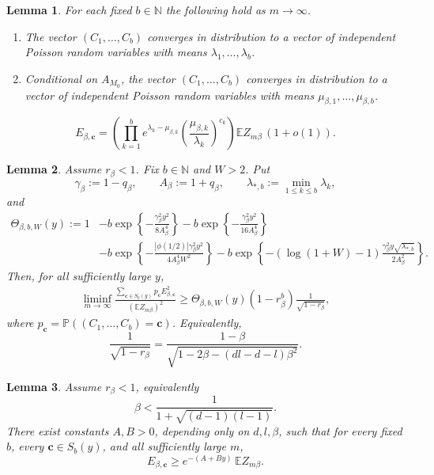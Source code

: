 \documentclass[10pt,a4paper]{amsart}
\newtheorem{lemma}{Lemma}
\begin{document}
\begin{lemma}\label{l33}
For each fixed \(b\in\mathbb N\) the following hold as \(m\to\infty\).
\begin{enumerate}
\item The vector \((C_1,\ldots,C_b)\) converges in distribution to a vector of
independent Poisson random variables with means \(\lambda_1,\ldots,\lambda_b\).
\item Conditional on \(A_{M_0}\), the vector \((C_1,\ldots,C_b)\) converges in
distribution to a vector of independent Poisson random variables with means
\(\mu_{\beta,1},\ldots,\mu_{\beta,b}\).
\end{enumerate}
\end{lemma}

\begin{equation}\label{ebc}
  E_{\beta,\mathbf c}
  =\left(\prod_{k=1}^b
      e^{\lambda_k-\mu_{\beta,k}}
      \left(\frac{\mu_{\beta,k}}{\lambda_k}\right)^{c_k}\right)
    \mathbb E Z_{m\beta}\,(1+o(1)).
\end{equation}

\begin{lemma}\label{l35}
Assume \(r_\beta<1\).  Fix \(b\in\mathbb N\) and \(W>2\).  Put
\[
  \gamma_\beta:=1-q_\beta,
  \qquad A_\beta:=1+q_\beta,
  \qquad \lambda_{*,b}:=\min_{1\le k\le b}\lambda_k,
\]
and
\begin{align*}
\Theta_{\beta,b,W}(y)
:=1&-b\exp\left\{-\frac{\gamma_\beta^2y^2}{8A_\beta^4}\right\}
    -b\exp\left\{-\frac{\gamma_\beta^2y^2}{16A_\beta^4}\right\} \\
&-b\exp\left\{-\frac{|\phi(1/2)|\gamma_\beta^2y^2}{4A_\beta^4W^2}\right\}
    -b\exp\left\{-(\log(1+W)-1)
       \frac{\gamma_\beta^2y\sqrt{\lambda_{*,b}}}{2A_\beta^2}\right\}.
\end{align*}
Then, for all sufficiently large \(y\),
\begin{align*}
\liminf_{m\to\infty}
\frac{\sum_{\mathbf c\in S_b(y)}p_{\mathbf c}E_{\beta,\mathbf c}^2}
     {(\mathbb E Z_{m\beta})^2}
\ge
\Theta_{\beta,b,W}(y)
\left(1-r_\beta^b\right)
\frac1{\sqrt{1-r_\beta}},
\end{align*}
where \(p_{\mathbf c}=\mathbb P((C_1,\ldots,C_b)=\mathbf c)\).
Equivalently,
\[
  \frac1{\sqrt{1-r_\beta}}
  =\frac{1-\beta}{\sqrt{1-2\beta-(dl-d-l)\beta^2}}.
\]
\end{lemma}

\begin{lemma}\label{l38}
Assume \(r_\beta<1\), equivalently
\[
  \beta<\frac1{1+\sqrt{(d-1)(l-1)}}.
\]
There exist constants \(A,B>0\), depending only on \(d,l,\beta\), such that for
every fixed \(b\), every \(\mathbf c\in S_b(y)\), and all sufficiently large \(m\),
\[
  E_{\beta,\mathbf c}\ge e^{-(A+By)}\,\mathbb E Z_{m\beta}.
\]
\end{lemma}
\end{document}
